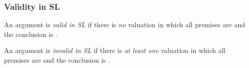 \begin{frame}
  \frametitle{Validity in SL}

  \begin{definition}
  An argument is \emph{valid in SL} if there is \emph{no} valuation in which
  all premises are \True{} and the conclusion is \False.

  An argument is \emph{invalid in SL} if there is \emph{at least one}
  valuation in which all premises are \True{} and the conclusion is
  \False.
  \end{definition}
 
  
\end{frame}

